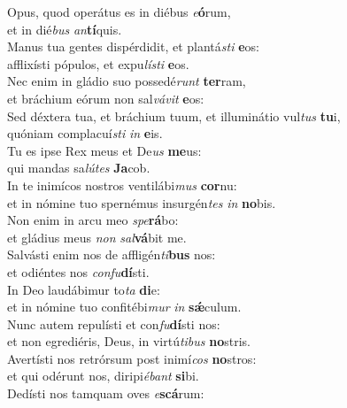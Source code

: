 \evenverse Opus, quod operátus es in diébus \textit{e}\textbf{ó}rum,~\*\\
\evenverse et in dié\textit{bus} \textit{an}\textbf{tí}quis.\\
\oddverse Manus tua gentes dispérdidit, et plantá\textit{sti} \textbf{e}os:~\*\\
\oddverse afflixísti pópulos, et expu\textit{lí}\textit{sti} \textbf{e}os.\\
\evenverse Nec enim in gládio suo possedé\textit{runt} \textbf{ter}ram,~\*\\
\evenverse et bráchium eórum non sal\textit{vá}\textit{vit} \textbf{e}os:\\
\oddverse Sed déxtera tua, et bráchium tuum, et illuminátio vul\textit{tus} \textbf{tu}i,~\*\\
\oddverse quóniam complacuí\textit{sti} \textit{in} \textbf{e}is.\\
\evenverse Tu es ipse Rex meus et De\textit{us} \textbf{me}us:~\*\\
\evenverse qui mandas sa\textit{lú}\textit{tes} \textbf{Ja}cob.\\
\oddverse In te inimícos nostros ventilábi\textit{mus} \textbf{cor}nu:~\*\\
\oddverse et in nómine tuo spernémus insurgén\textit{tes} \textit{in} \textbf{no}bis.\\
\evenverse Non enim in arcu meo \textit{spe}\textbf{rá}bo:~\*\\
\evenverse et gládius meus \textit{non} \textit{sal}\textbf{vá}bit me.\\
\oddverse Salvásti enim nos de affligén\textit{ti}\textbf{bus} nos:~\*\\
\oddverse et odiéntes nos \textit{con}\textit{fu}\textbf{dí}sti.\\
\evenverse In Deo laudábimur to\textit{ta} \textbf{di}e:~\*\\
\evenverse et in nómine tuo confitébi\textit{mur} \textit{in} \textbf{sǽ}culum.\\
\oddverse Nunc autem repulísti et con\textit{fu}\textbf{dí}sti nos:~\*\\
\oddverse et non egrediéris, Deus, in virtú\textit{ti}\textit{bus} \textbf{no}stris.\\
\evenverse Avertísti nos retrórsum post inimí\textit{cos} \textbf{no}stros:~\*\\
\evenverse et qui odérunt nos, diripi\textit{é}\textit{bant} \textbf{si}bi.\\
\oddverse Dedísti nos tamquam oves \textit{e}\textbf{scá}rum:~\*\\
